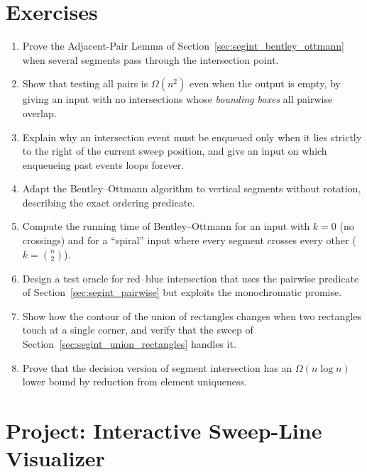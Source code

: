 \section{Exercises}
\label{sec:segint_exercises}

\begin{enumerate}
  \item Prove the Adjacent-Pair Lemma of Section~\ref{sec:segint_bentley_ottmann}
    when several segments pass through the intersection point.
  \item Show that testing all pairs is $\Omega(n^2)$ even when the output
    is empty, by giving an input with no intersections whose
    \emph{bounding boxes} all pairwise overlap.
  \item Explain why an intersection event must be enqueued only when it
    lies strictly to the right of the current sweep position, and give an
    input on which enqueueing past events loops forever.
  \item Adapt the Bentley--Ottmann algorithm to vertical segments without
    rotation, describing the exact ordering predicate.
  \item Compute the running time of Bentley--Ottmann for an input with
    $k = 0$ (no crossings) and for a ``spiral'' input where every segment
    crosses every other ($k = \binom{n}{2}$).
  \item Design a test oracle for red--blue intersection that uses the
    pairwise predicate of Section~\ref{sec:segint_pairwise} but exploits
    the monochromatic promise.
  \item Show how the contour of the union of rectangles changes when two
    rectangles touch at a single corner, and verify that the sweep of
    Section~\ref{sec:segint_union_rectangles} handles it.
  \item Prove that the decision version of segment intersection has an
    $\Omega(n\log n)$ lower bound by reduction from element uniqueness.
\end{enumerate}

\section{Project: Interactive Sweep-Line Visualizer}
\label{sec:segint_project}

